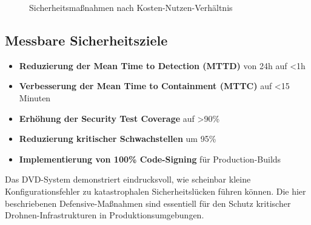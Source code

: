 \documentclass[11pt,a4paper]{article}
\begin{document}
\begin{figure}[h]
\centering
{}
\caption{Sicherheitsmaßnahmen nach Kosten-Nutzen-Verhältnis}
\end{figure}

\subsection{Messbare Sicherheitsziele}

\begin{itemize}[leftmargin=*]
    \item \textbf{Reduzierung der Mean Time to Detection (MTTD)} von 24h auf <1h
    \item \textbf{Verbesserung der Mean Time to Containment (MTTC)} auf <15 Minuten
    \item \textbf{Erhöhung der Security Test Coverage} auf >90\%
    \item \textbf{Reduzierung kritischer Schwachstellen} um 95\%
    \item \textbf{Implementierung von 100\% Code-Signing} für Production-Builds
\end{itemize}

Das DVD-System demonstriert eindrucksvoll, wie scheinbar kleine Konfigurationsfehler zu katastrophalen Sicherheitslücken führen können. Die hier beschriebenen Defensive-Maßnahmen sind essentiell für den Schutz kritischer Drohnen-Infrastrukturen in Produktionsumgebungen.
\end{document}
